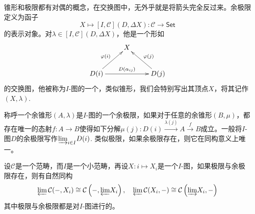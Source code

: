 \begin{para}
锥形和极限都有对偶的概念，在交换图中，无外乎就是将箭头完全反过来。余极限定义为函子
\[
	X\mapsto [I,\mathcal{C}](D,\Delta X):\mathcal{C}\to \mathsf{Set}
\]
的表示对象。对$\lambda\in [I,\mathcal{C}](D,\Delta X)$，他是一个形如
\[
	\xymatrix{
		&X&\\
		D(i)\ar[rr]^-{D(\alpha_{ij})}\ar[ur]^{\varphi(i)}&&D(j)\ar[ul]_{\varphi(j)}
	}
\]
的交换图，他被称为$I$-图的一个，类似锥形，我们会特别写出其顶点$X$，将其记作$(X,\lambda)$.

称呼一个余锥形$(A,\lambda)$是$I$-图的一个{余极限}，如果对于任意的余锥形$(B,\mu)$，都存在唯一的态射$f:A\to B$使得如下分解$\mu(j):D(i)\xrightarrow{\lambda(j)}A\xrightarrow{f}B$成立。一般将$I$-图$D$的余极限写作${\varinjlim}_{i\in I} D(i)$. 类似极限，如果余极限存在，则它在同构意义上唯一。
\end{para}

\begin{pro}\label{homlimit}
设$\mathcal{C}$是一个范畴，而$I$是一个小范畴，再设$X:i\mapsto X_i$是一个$I$-图，如果极限与余极限存在，则有自然同构
\[
	{\varprojlim} \,\mathcal{C}(-,X_i)\cong \mathcal{C}\left(-,{\varprojlim} X_i\right),\quad {\varprojlim}\, \mathcal{C}(X_i,-)\cong  \mathcal{C}\left({\varinjlim} X_i,-\right)
\]
其中极限与余极限都是对$I$-图进行的。
\end{pro}


